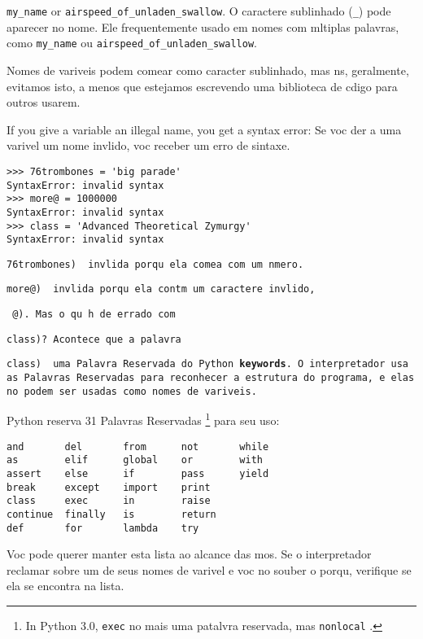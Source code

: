 {{{{%
\verb"my_name" or \verb"airspeed_of_unladen_swallow".
O caractere sublinhado (\verb"_") pode aparecer no nome.
Ele   frequentemente usado em nomes com m ltiplas palavras, como 
\verb"my_name" ou \verb"airspeed_of_unladen_swallow".

Nomes de vari veis podem come ar como caracter sublinhado, mas
n s, geralmente, evitamos isto, a menos que estejamos escrevendo uma biblioteca
de c digo para outros usarem.

If you give a variable an illegal name, you get a syntax error:
Se voc  der a uma vari vel um nome inv lido, voc  receber  um erro de sintaxe.
\beforeverb
\begin{verbatim}
>>> 76trombones = 'big parade'
SyntaxError: invalid syntax
>>> more@ = 1000000
SyntaxError: invalid syntax
>>> class = 'Advanced Theoretical Zymurgy'
SyntaxError: invalid syntax
\end{verbatim}
\afterverb
%
{\tt 76trombones)   inv lida porqu  ela come a com um n mero.
{\tt more@)   inv lida porqu  ela cont m um caractere inv lido,{\tt 
@). Mas o qu  h  de errado com {\tt class)?
Acontece que a palavra {\tt class)   uma Palavra Reservada do Python {\bf keywords}.
O interpretador usa as Palavras Reservadas para reconhecer a estrutura do programa,
e elas n o podem ser usadas como nomes de vari veis.

Python reserva 31 Palavras Reservadas \footnote{In Python 3.0, {\tt exec} n o   
mais uma patalvra reservada, mas {\tt nonlocal}  .} para seu uso:

\beforeverb
\begin{verbatim}
and       del       from      not       while    
as        elif      global    or        with     
assert    else      if        pass      yield    
break     except    import    print              
class     exec      in        raise              
continue  finally   is        return             
def       for       lambda    try
\end{verbatim}
\afterverb
%
Voc  pode querer manter esta lista ao alcance das m os. Se o interpretador reclamar
sobre um de seus nomes de vari vel e voc  n o souber o porqu , verifique se ela 
se encontra na lista.

}}}}}}}}}
